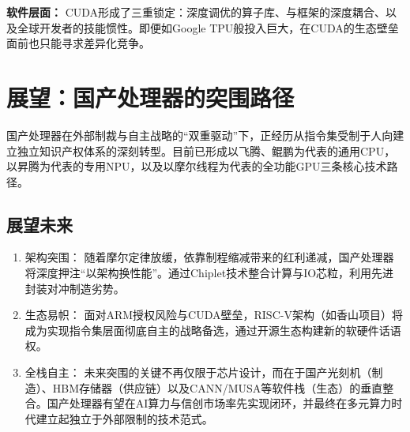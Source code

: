 \documentclass[a4paper]{article}
\begin{document}
\textbf{软件层面：} CUDA形成了三重锁定：深度调优的算子库、与框架的深度耦合、以及全球开发者的技能惯性。即便如Google TPU般投入巨大，在CUDA的生态壁垒面前也只能寻求差异化竞争。


\section{展望：国产处理器的突围路径}
国产处理器在外部制裁与自主战略的“双重驱动”下，正经历从指令集受制于人向建立独立知识产权体系的深刻转型。目前已形成以飞腾、鲲鹏为代表的通用CPU，以昇腾为代表的专用NPU，以及以摩尔线程为代表的全功能GPU三条核心技术路径。
\subsection{展望未来}
\begin{enumerate}
  \item 架构突围： 随着摩尔定律放缓，依靠制程缩减带来的红利递减，国产处理器将深度押注“以架构换性能”。通过Chiplet技术整合计算与IO芯粒，利用先进封装对冲制造劣势。
  \item 生态易帜： 面对ARM授权风险与CUDA壁垒，RISC-V架构（如香山项目）将成为实现指令集层面彻底自主的战略备选，通过开源生态构建新的软硬件话语权。
  \item 全栈自主： 未来突围的关键不再仅限于芯片设计，而在于国产光刻机（制造）、HBM存储器（供应链）以及CANN/MUSA等软件栈（生态）的垂直整合。国产处理器有望在AI算力与信创市场率先实现闭环，并最终在多元算力时代建立起独立于外部限制的技术范式。
\end{enumerate}


\newpage

 
\end{document}
